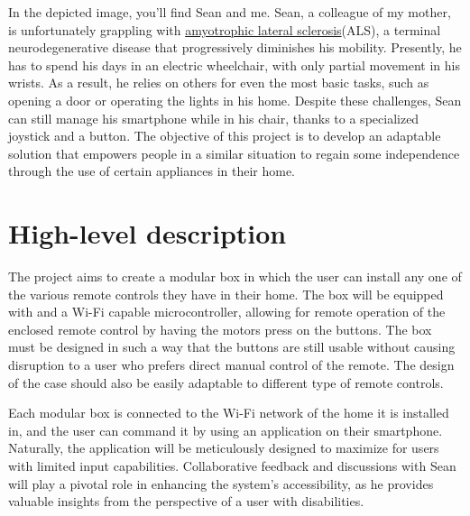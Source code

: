 \begin{minipage}[t]{0.65\textwidth}
    In the depicted image, you'll find Sean and me.
    Sean, a colleague of my mother, is unfortunately grappling with \href{https://en.wikipedia.org/wiki/ALS}{amyotrophic lateral sclerosis}\footnotemark (ALS), a terminal neurodegenerative disease that progressively diminishes his mobility.
    Presently, he has to spend his days in an electric wheelchair, with only partial movement in his wrists.
    As a result, he relies on others for even the most basic tasks, such as opening a door or operating the lights in his home.
    Despite these challenges, Sean can still manage his smartphone while in his chair, thanks to a specialized joystick and a button.
    The objective of this project is to develop an adaptable solution that empowers people in a similar situation to regain some independence through the use of certain appliances in their home.
\end{minipage}\hfill
\begin{minipage}[t]{0.30\textwidth}
  \centering{}
\end{minipage}

\vspace{-10pt}

\section{High-level description}

The project aims to create a modular box in which the user can install any one of the various remote controls they have in their home.
The box will be equipped with  and a Wi-Fi capable microcontroller, allowing for remote operation of the enclosed remote control by having the motors press on the buttons.
The box must be designed in such a way that the buttons are still usable without causing disruption to a user who prefers direct manual control of the remote.
The design of the case should also be easily adaptable to different type of remote controls.

Each modular box is connected to the Wi-Fi network of the home it is installed in, and the user can command it by using an application on their smartphone.
Naturally, the application will be meticulously designed to maximize  for users with limited input capabilities.
Collaborative feedback and discussions with Sean will play a pivotal role in enhancing the system's accessibility, as he provides valuable insights from the perspective of a user with disabilities.


